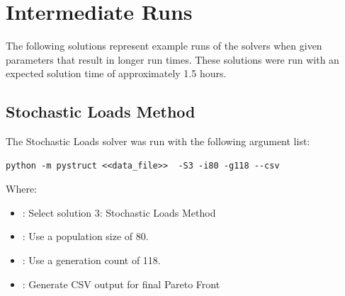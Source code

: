 \section{Intermediate Runs}
The following solutions represent example runs of the solvers when given parameters that result in longer run times. These solutions were run with an expected solution time of approximately 1.5 hours. 

\subsection{Stochastic Loads Method}
The Stochastic Loads solver was run with the following argument list: 

\begin{verbatim}
python -m pystruct <<data_file>>  -S3 -i80 -g118 --csv
\end{verbatim}

\noindent Where: 

\begin{itemize}
  \item {}: Select solution 3: Stochastic Loads Method
  \item {}: Use a population size of 80. 
  \item {}: Use a generation count of 118. 
  \item {}: Generate CSV output for final Pareto Front
\end{itemize}


